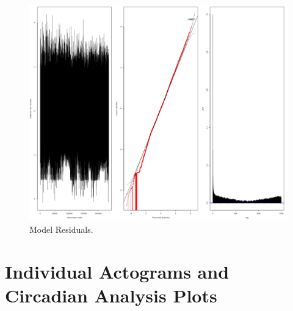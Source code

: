 \documentclass[english,msc,numbers,hidelinks]{coppe}
\begin{document}
  \begin{figure}

  {\centering \includegraphics[width=1\linewidth]{../04_figures/residuals/m2_PR} 

  }

  \caption{Model Residuals.}\label{fig:appendix-residuals}
  \end{figure}
  \hypertarget{individual-actograms-and-circadian-analysis-plots}{%
  \chapter{Individual Actograms and Circadian Analysis Plots}\label{individual-actograms-and-circadian-analysis-plots}}
\end{document}
